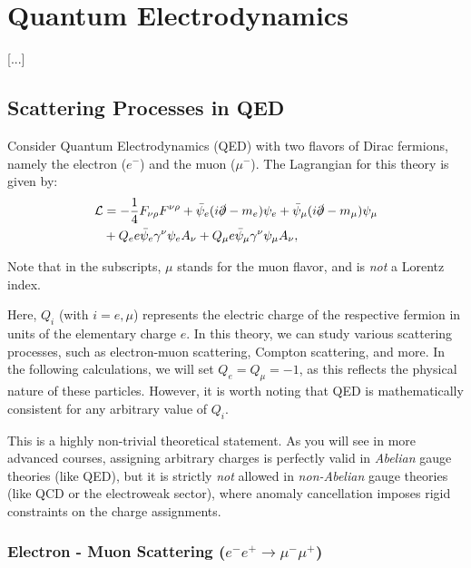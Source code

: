 \chapter{Quantum Electrodynamics}

 [...]

\section{Scattering Processes in QED}

Consider Quantum Electrodynamics (QED) with two flavors of Dirac fermions, namely the electron (\(e^-\)) and the muon (\(\mu^-\)). The Lagrangian for this theory is given by:
\[
    \begin{aligned}
        \mathcal{L} & = - \frac{1}{4} F_{\nu \rho} F^{\nu \rho} + \bar{\psi}_e (i \slashed{\partial} - m_e) \psi_e + \bar{\psi}_\mu (i \slashed{\partial} - m_\mu) \psi_\mu \\
                    & + Q_e e \bar{\psi}_e \gamma^\nu \psi_e A_\nu + Q_\mu e \bar{\psi}_\mu \gamma^\nu \psi_\mu A_\nu,
    \end{aligned}
\]
\begin{remark}
    Note that in the subscripts, \(\mu\) stands for the muon flavor, and is \textit{not} a Lorentz index.
\end{remark}

Here, \(Q_i\) (with \(i = e, \mu\)) represents the electric charge of the respective fermion in units of the elementary charge \(e\). In this theory, we can study various scattering processes, such as electron-muon scattering, Compton scattering, and more. In the following calculations, we will set \(Q_e = Q_\mu = -1\), as this reflects the physical nature of these particles. However, it is worth noting that QED is mathematically consistent for any arbitrary value of \(Q_i\).
\begin{remark}
    This is a highly non-trivial theoretical statement. As you will see in more advanced courses, assigning arbitrary charges is perfectly valid in \textit{Abelian} gauge theories (like QED), but it is strictly \textit{not} allowed in \textit{non-Abelian} gauge theories (like QCD or the electroweak sector), where anomaly cancellation imposes rigid constraints on the charge assignments.
\end{remark}

\subsection{Electron - Muon Scattering (\(e^- e^+ \to \mu^- \mu^+\))}

